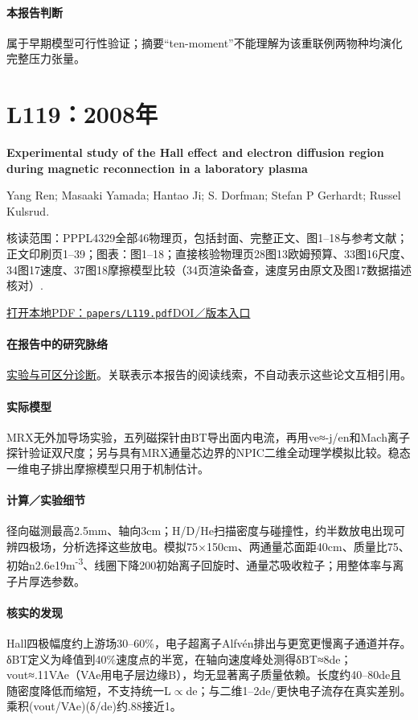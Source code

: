 \paragraph{本报告判断}属于早期模型可行性验证；摘要“ten-moment”不能理解为该重联例两物种均演化完整压力张量。

\section{L119：2008年}\label{paper:L119}

\textbf{Experimental study of the Hall effect and electron diffusion region during magnetic reconnection in a laboratory plasma}\citep{L119}\

Yang Ren;  Masaaki Yamada;  Hantao Ji;  S. Dorfman;  Stefan P Gerhardt;  Russel Kulsrud.

\textsf{核读范围：}PPPL4329全部46物理页，包括封面、完整正文、图1–18与参考文献；正文印刷页1–39；\textsf{图表：}图1–18；直接核验物理页28图13欧姆预算、33图16尺度、34图17速度、37图18摩擦模型比较（34页渲染备查，速度另由原文及图17数据描述核对）.

\href{run:papers/L119.pdf}{打开本地PDF：\texttt{papers/L119.pdf}}\quad\href{https://doi.org/10.1063/1.2936269}{DOI／版本入口}

\paragraph{在报告中的研究脉络}\hyperref[story:diagnostic]{实验与可区分诊断}。关联表示本报告的阅读线索，不自动表示这些论文互相引用。

\paragraph{实际模型}MRX无外加导场实验，五列磁探针由BT导出面内电流，再用ve≈-j/en和Mach离子探针验证双尺度；另与具有MRX通量芯边界的NPIC二维全动理学模拟比较。稳态一维电子排出摩擦模型只用于机制估计。

\paragraph{计算／实验细节}径向磁测最高2.5mm、轴向3cm；H/D/He扫描密度与碰撞性，约半数放电出现可辨四极场，分析选择这些放电。模拟75×150cm、两通量芯面距40cm、质量比75、初始n2.6e19m\textsuperscript{-3}、线圈下降200初始离子回旋时、通量芯吸收粒子；用整体率与离子片厚选参数。

\paragraph{核实的发现}Hall四极幅度约上游场30–60\%，电子超离子Alfvén排出与更宽更慢离子通道并存。δBT定义为峰值到40\%速度点的半宽，在轴向速度峰处测得δBT≈8de；vout≈.11VAe（VAe用电子层边缘B），均无显著离子质量依赖。长度约40–80de且随密度降低而缩短，不支持统一L\ensuremath{\propto}de；与二维1–2de/更快电子流存在真实差别。乘积(vout/VAe)(δ/de)约.88接近1。


